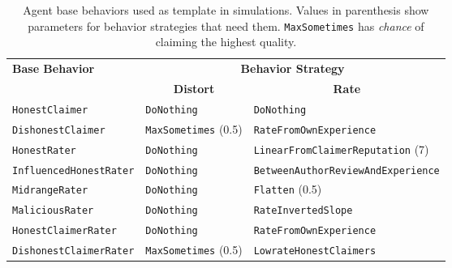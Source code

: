 \documentclass[%
    ]{\PathToTumTemplate/thesis/tum_thesis}
\begin{document}
\begin{table}[tbp]
\centering
\begin{tabular}{@{}lll@{}}
\toprule
\multirow{2}{*}[-0.2em]{\textbf{Base Behavior}} & \multicolumn{2}{c}{\textbf{Behavior Strategy}} \\ \cmidrule(lr){2-3}
 & \multicolumn{1}{c}{\textbf{Distort}} & \multicolumn{1}{c}{\textbf{Rate}} \\ \midrule
\texttt{HonestClaimer} & \texttt{DoNothing} & \texttt{DoNothing} \\
\texttt{DishonestClaimer} & \texttt{MaxSometimes} (0.5) & \texttt{RateFromOwnExperience} \\
\texttt{HonestRater} & \texttt{DoNothing} & \texttt{LinearFromClaimerReputation} (7)\\
\texttt{InfluencedHonestRater} & \texttt{DoNothing} & \texttt{BetweenAuthorReviewAndExperience} \\
\texttt{MidrangeRater} & \texttt{DoNothing} & \texttt{Flatten} (0.5) \\
\texttt{MaliciousRater} & \texttt{DoNothing} & \texttt{RateInvertedSlope} \\
\texttt{HonestClaimerRater} & \texttt{DoNothing} & \texttt{RateFromOwnExperience} \\
\texttt{DishonestClaimerRater} & \texttt{MaxSometimes} (0.5) & \texttt{LowrateHonestClaimers} \\
\bottomrule
\end{tabular}
\caption{
	Agent base behaviors used as template in simulations.
	Values in parenthesis show parameters for behavior strategies that need them.
	\texttt{MaxSometimes} has \emph{chance} of claiming the highest quality.
}
\label{tab:agent_base_behaviors}
\end{table}
\end{document}
